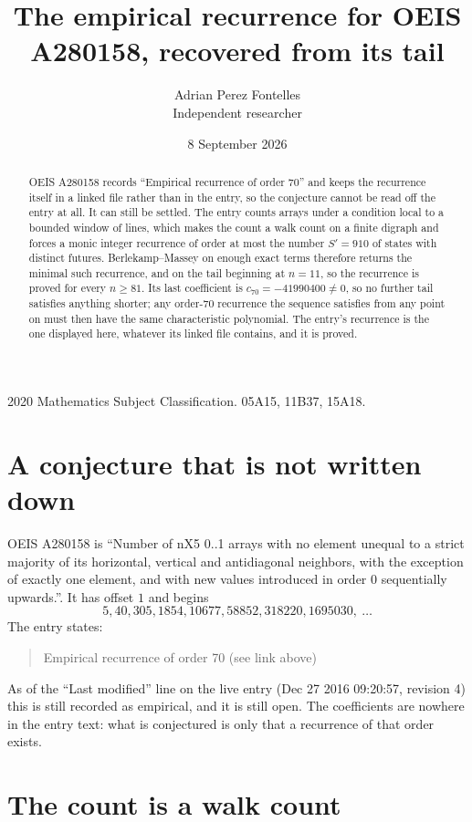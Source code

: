\documentclass[11pt,a4paper]{article}
\title{The empirical recurrence for OEIS A280158, recovered from its tail}
\author{Adrian Perez Fontelles\\ \small Independent researcher}
\date{8 September 2026}
\theoremstyle{plain}
\theoremstyle{definition}
\begin{document}
\maketitle

\begin{abstract}
OEIS A280158 records ``Empirical recurrence of order $70$'' and keeps the recurrence itself in
a linked file rather than in the entry, so the conjecture cannot be read off the entry at all.
It can still be settled. The entry counts arrays under a condition local to a bounded window of
lines, which makes the count a walk count on a finite digraph and forces a monic integer
recurrence of order at most the number $S'=910$ of states with distinct futures. Berlekamp--Massey on
enough exact terms therefore returns the minimal such recurrence, and on the tail beginning at $n=11$, so the recurrence is proved for every $n\ge81$.
Its last coefficient is $c_{70}=-41990400\neq0$, so no further tail satisfies anything
shorter; any order-$70$ recurrence the sequence satisfies from any point on must then have
the same characteristic polynomial. The entry's recurrence is the one displayed here, whatever
its linked file contains, and it is proved.
\end{abstract}

\noindent\small 2020 Mathematics Subject Classification. 05A15, 11B37, 15A18.\normalsize

\section{A conjecture that is not written down}

OEIS A280158 is ``Number of nX5 0..1 arrays with no element unequal to a strict majority of its horizontal, vertical and antidiagonal neighbors, with the exception of exactly one element, and with new values introduced in order 0 sequentially upwards.''. It has offset $1$ and begins
\[
5, 40, 305, 1854, 10677, 58852, 318220, 1695030,\ \dots
\]
The entry states:
\begin{quote}
Empirical recurrence of order 70 (see link above)
\end{quote}
As of the ``Last modified'' line on the live entry (Dec 27 2016 09:20:57, revision 4)
this is still recorded as empirical, and it is still open. The coefficients are nowhere in the
entry text: what is conjectured is only that a recurrence of that order exists.

\section{The count is a walk count}
\end{document}

